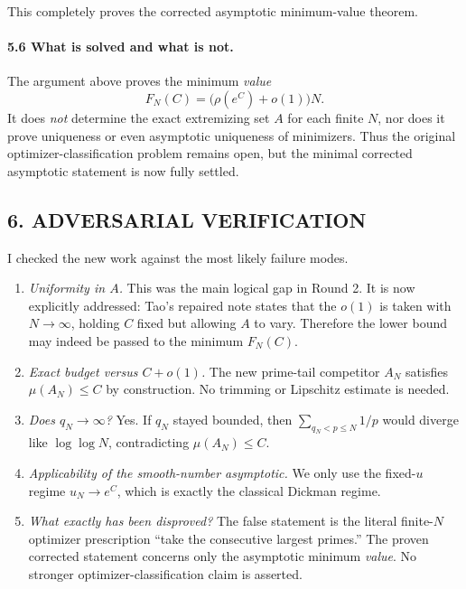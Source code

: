 This completely proves the corrected asymptotic minimum-value theorem.

\paragraph{5.6 What is solved and what is not.}

The argument above proves the minimum \emph{value}
\[
F_N(C)=\bigl(\rho(e^C)+o(1)\bigr)N.
\]
It does \emph{not} determine the exact extremizing set \(A\) for each finite \(N\), nor does it prove uniqueness or even asymptotic uniqueness of minimizers.  Thus the original optimizer-classification problem remains open, but the minimal corrected asymptotic statement is now fully settled.

\subsection*{6. ADVERSARIAL VERIFICATION}

I checked the new work against the most likely failure modes.

\begin{enumerate}
    \item \emph{Uniformity in \(A\).}  
    This was the main logical gap in Round 2.  It is now explicitly addressed: Tao's repaired note states that the \(o(1)\) is taken with \(N\to\infty\), holding \(C\) fixed but allowing \(A\) to vary.  Therefore the lower bound may indeed be passed to the minimum \(F_N(C)\).

    \item \emph{Exact budget versus \(C+o(1)\).}  
    The new prime-tail competitor \(A_N\) satisfies \(\mu(A_N)\le C\) by construction.  No trimming or Lipschitz estimate is needed.

    \item \emph{Does \(q_N\to\infty\)?}  
    Yes.  If \(q_N\) stayed bounded, then \(\sum_{q_N<p\le N}1/p\) would diverge like \(\log\log N\), contradicting \(\mu(A_N)\le C\).

    \item \emph{Applicability of the smooth-number asymptotic.}  
    We only use the fixed-\(u\) regime \(u_N\to e^C\), which is exactly the classical Dickman regime.

    \item \emph{What exactly has been disproved?}  
    The false statement is the literal finite-\(N\) optimizer prescription ``take the consecutive largest primes.''  The proven corrected statement concerns only the asymptotic minimum \emph{value}.  No stronger optimizer-classification claim is asserted.
\end{enumerate}

